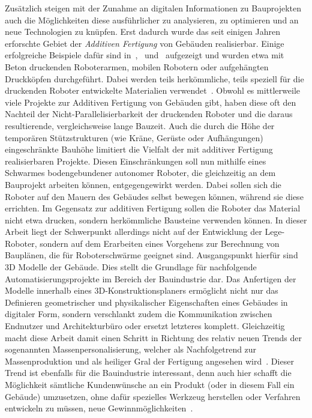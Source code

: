 Zusätzlich steigen mit der Zunahme an digitalen Informationen zu Bauprojekten auch die Möglichkeiten diese ausführlicher zu analysieren, zu optimieren und an neue Technologien zu knüpfen.
Erst dadurch wurde das seit einigen Jahren erforschte Gebiet der \textit{Additiven Fertigung} von Gebäuden realisierbar.
Einige erfolgreiche Beispiele dafür sind in~\cite{AdditiveManufactoringDelgado},~\cite{AdditiveManufacturingUsingMobileRobots} und~\cite{Tankova2020} aufgezeigt und wurden etwa mit Beton druckenden Roboterarmen, mobilen Robotern oder aufgehängten Druckköpfen durchgeführt.
Dabei werden teils herkömmliche, teils speziell für die druckenden Roboter entwickelte Materialien verwendet~\cite{Tankova2020}.
Obwohl es mittlerweile viele Projekte zur Additiven Fertigung von Gebäuden gibt, haben diese oft den Nachteil der Nicht-Parallelisierbarkeit der druckenden Roboter und die daraus resultierende, vergleichsweise lange Bauzeit.
Auch die durch die Höhe der temporären Stützstrukturen (wie Kräne, Gerüste oder Aufhängungen) eingeschränkte Bauhöhe limitiert die Vielfalt der mit additiver Fertigung realisierbaren Projekte.
Diesen Einschränkungen soll nun mithilfe eines Schwarmes bodengebundener autonomer Roboter, die gleichzeitig an dem Bauprojekt arbeiten können, entgegengewirkt werden.
Dabei sollen sich die Roboter auf den Mauern des Gebäudes selbst bewegen können, während sie diese errichten.
Im Gegensatz zur additiven Fertigung sollen die Roboter das Material nicht etwa drucken, sondern herkömmliche Bausteine verwenden können.
In dieser Arbeit liegt der Schwerpunkt allerdings nicht auf der Entwicklung der Lege-Roboter, sondern auf dem Erarbeiten eines Vorgehens zur Berechnung von Bauplänen, die für Roboterschwärme geeignet sind.
Ausgangspunkt hierfür sind 3D Modelle der Gebäude.
Dies stellt die Grundlage für nachfolgende Automatisierungsprojekte im Bereich der Bauindustrie dar.
Das Anfertigen der Modelle innerhalb eines 3D-Konstruktionsplaners ermöglicht nicht nur das Definieren geometrischer und physikalischer Eigenschaften eines Gebäudes in digitaler Form, sondern verschlankt zudem die Kommunikation zwischen Endnutzer und Architekturbüro oder ersetzt letzteres komplett.
Gleichzeitig macht diese Arbeit damit einen Schritt in Richtung des relativ neuen Trends der sogenannten Massenpersonalisierung, welcher als Nachfolgetrend zur Massenproduktion und als \glqq{}heiliger Gral\grqq{} der Fertigung angesehen wird~\cite{MassCustomHolyGrail}.
Dieser Trend ist ebenfalls für die Bauindustrie interessant, denn auch hier schafft die Möglichkeit sämtliche Kundenwünsche an ein Produkt (oder in diesem Fall ein Gebäude) umzusetzen, ohne dafür spezielles Werkzeug herstellen oder Verfahren entwickeln zu müssen, neue Gewinnmöglichkeiten~\cite{Jensen2018}\cite{Jensen2015}.
